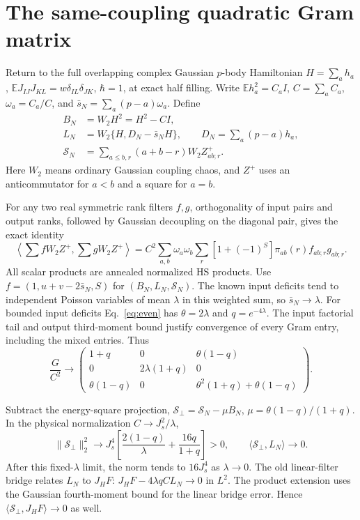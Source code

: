 \documentclass[11pt,a4paper]{article}
\newcommand{\EE}{\mathbb E}
\begin{document}
\newpage
\section{The same-coupling quadratic Gram matrix}
Return to the full overlapping complex Gaussian $p$-body Hamiltonian
$H=\sum_a h_a$, $\EE J_{IJ}J_{KL}=w\delta_{IL}\delta_{JK}$,
$\hbar=1$, at exact half filling. Write
$\EE h_a^2=C_aI$, $C=\sum_a C_a$, $\omega_a=C_a/C$,
and $\bar s_N=\sum_a(p-a)\omega_a$. Define
\begin{align}
 B_N&=W_2H^2=H^2-CI,\\
 L_N&=W_2\{H,D_N-\bar s_NH\},\qquad D_N=\sum_a(p-a)h_a,\\
 \mathcal S_N&=\sum_{a\le b,r}(a+b-r)W_2Z^+_{ab;r}.
\end{align}
Here $W_2$ means ordinary Gaussian coupling chaos, and $Z^+$ uses
an anticommutator for $a<b$ and a square for $a=b$.

For any two real symmetric rank filters $f,g$, orthogonality of
input pairs and output ranks, followed by Gaussian decoupling on
the diagonal pair, gives the exact identity
\begin{equation}
 \left\langle\sum fW_2Z^+,\sum gW_2Z^+\right\rangle
 =C^2\sum_{a,b}\omega_a\omega_b
       \sum_r[1+(-1)^S]\pi_{ab}(r)f_{ab;r}g_{ab;r}.
 \label{eq:gram}
\end{equation}
All scalar products are annealed normalized HS products.
Use $f=(1,u+v-2\bar s_N,S)$ for $(B_N,L_N,\mathcal S_N)$.
The known input deficits tend to independent Poisson variables of
mean $\lambda$ in this weighted sum, so $\bar s_N\to\lambda$.
For bounded input deficits Eq.~\eqref{eq:even} has
$\theta=2\lambda$ and $q=e^{-4\lambda}$. The input factorial tail
and output third-moment bound justify convergence of every Gram
entry, including the mixed entries. Thus
\begin{equation}
 \frac{G}{C^2}\longrightarrow
 \begin{pmatrix}
 1+q&0&\theta(1-q)\\
 0&2\lambda(1+q)&0\\
 \theta(1-q)&0&\theta^2(1+q)+\theta(1-q)
 \end{pmatrix}.
 \label{eq:matrix}
\end{equation}

Subtract the energy-square projection,
$\mathcal S_\perp=\mathcal S_N-\mu B_N$,
$\mu=\theta(1-q)/(1+q)$. In the physical normalization
$C\to J_s^2/\lambda$,
\begin{equation}
 \|\mathcal S_\perp\|_2^2\longrightarrow
 J_s^4\left[\frac{2(1-q)}\lambda+\frac{16q}{1+q}\right]>0,
 \qquad \langle\mathcal S_\perp,L_N\rangle\to0.
\end{equation}
After this fixed-$\lambda$ limit, the norm tends to $16J_s^4$ as
$\lambda\to0$. The old linear-filter bridge relates $L_N$ to
$J_HF$: $J_HF-4\lambda qC L_N\to0$ in $L^2$. The product extension
uses the Gaussian fourth-moment bound for the linear bridge error.
Hence $\langle\mathcal S_\perp,J_HF\rangle\to0$ as well.
\end{document}
